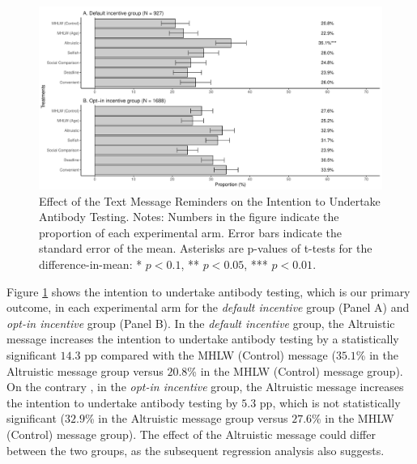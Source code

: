 \documentclass[
  11pt,
  a4paper
]{article}
\begin{document}
\begin{figure}[t]
\includegraphics{Main-Document-LaTeX_files/figure-latex/ttest-int-test-1} \caption{Effect of the Text Message Reminders on the Intention to Undertake Antibody Testing. Notes: Numbers in the figure indicate the proportion of each experimental arm. Error bars indicate the standard error of the mean. Asterisks are p-values of t-tests for the difference-in-mean: * $p < 0.1$, ** $p < 0.05$, *** $p < 0.01$.}\label{fig:ttest-int-test}
\end{figure}

Figure \ref{fig:ttest-int-test} shows the intention to undertake antibody testing, which is our primary outcome, in each experimental arm for the \emph{default incentive} group (Panel A) and \emph{opt-in incentive} group (Panel B). In the \emph{default incentive} group, the Altruistic message increases the intention to undertake antibody testing by a statistically significant \(14.3\) pp compared with the MHLW (Control) message (\(35.1\)\% in the Altruistic message group versus \(20.8\)\% in the MHLW (Control) message group). On the contrary , in the \emph{opt-in incentive} group, the Altruistic message increases the intention to undertake antibody testing by \(5.3\) pp, which is not statistically significant (\(32.9\)\% in the Altruistic message group versus \(27.6\)\% in the MHLW (Control) message group). The effect of the Altruistic message could differ between the two groups, as the subsequent regression analysis also suggests.
\end{document}
